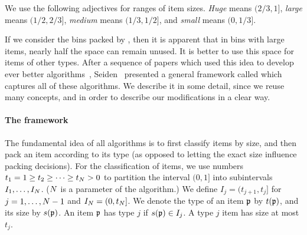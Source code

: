 \iffalse 
{\SuperH} algorithms classify items based on an interval partition of $(0,1]$ and give each item a color as it arrives, red or blue.
For each type $j$, the fraction of red items is some constant denoted by $\redfrac_j$. 
Blue items are packed as in \harm, i.e., for each item type $j$, every bin with blue
items contains a maximal number of blue items. (This may leave some space for
smaller red items of different types.) Red items are packed in bins which
are only partially filled. The idea is that hopefully, later blue items
of other types will arrive that can be placed into the bins with red items. \fi 

\begin{definition}
\label{def:1}
We use the following adjectives for ranges of item sizes.
\emph{Huge} means $(2/3,1]$, \emph{large} means $(1/2,2/3]$, \emph{medium} means $(1/3,1/2]$, and \emph{small} means $(0,1/3]$.
\end{definition}

If we consider the bins packed by \harm, then
it is apparent that in bins with large items, nearly half the space can remain
unused. It is better to use this space for items of other types.
After a sequence of papers which used this idea to develop ever better algorithms~\cite{LeeLee85,RaBrLL89,Richey91},
Seiden~\cite{Seiden02} presented a general framework called {\SuperH} which captures all of these algorithms. We describe it in some detail, since we reuse many concepts,
and in order to describe our modifications in a clear way.

\paragraph{The {\SuperH} framework~\cite{Seiden02}}

The fundamental idea of all \SuperH{} algorithms is to first classify items by
size, and then pack an item according to its type (as opposed to
letting the exact size influence packing decisions).
For the classification of items, we use numbers $t_1 = 1 \ge t_2 \ge \dots \ge t_N > 0$ to 
partition the interval
$(0,1]$ into subintervals $I_1,\dots,I_{N}$.
($N$ is a parameter of the algorithm.)
 We define $I_j=(t_{j+1},t_j]$
for $j=1,\dots,N-1$ and $I_{N}=(0,t_{N}]$.
We denote the type of an item $\mathfrak{p}$ by $t(\mathfrak{p})$, and its size by $s(\mathfrak{p})$.
An item $\mathfrak{p}$ has type $j$ if $s(\mathfrak{p})\in I_j$. 
A type $j$ item has size at most $t_j$. 

